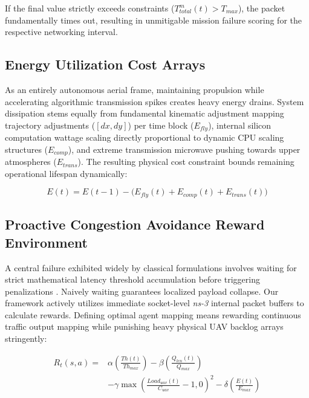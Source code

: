 \documentclass[conference]{IEEEtran}
\begin{document}
If the final value strictly exceeds constraints ($T_{total}^{m}(t) > T_{max}$), the packet fundamentally times out, resulting in unmitigable mission failure scoring for the respective networking interval.

\subsection{Energy Utilization Cost Arrays}
As an entirely autonomous aerial frame, maintaining propulsion while accelerating algorithmic transmission spikes creates heavy energy drains. System dissipation stems equally from fundamental kinematic adjustment mapping trajectory adjustments ($[dx, dy]$) per time block ($E_{fly}$), internal silicon computation wattage scaling directly proportional to dynamic CPU scaling structures ($E_{comp}$), and extreme transmission microwave pushing towards upper atmospheres ($E_{trans}$). The resulting physical cost constraint bounds remaining operational lifespan dynamically:

\begin{equation} \label{eq:energy}
E(t) = E(t-1) - \Big( E_{fly}(t) + E_{comp}(t) + E_{trans}(t) \Big)
\end{equation}

\subsection{Proactive Congestion Avoidance Reward Environment}
A central failure exhibited widely by classical formulations involves waiting for strict mathematical latency threshold accumulation before triggering penalizations \cite{sasinda2025}. Naively waiting guarantees localized payload collapse. Our framework actively utilizes immediate socket-level \textit{ns-3} internal packet buffers to calculate rewards. Defining optimal agent mapping means rewarding continuous traffic output mapping while punishing heavy physical UAV backlog arrays stringently: 

\begin{equation} \label{eq:reward}
\begin{split}
R_t(s,a) = & \alpha \left( \frac{Th(t)}{Th_{max}} \right) - \beta \left( \frac{Q_{len}(t)}{Q_{max}} \right) \\
           & - \gamma \max\left(\frac{Load_{uav}(t)}{C_{uav}} - 1, 0\right)^2 - \delta \left( \frac{E(t)}{E_{max}} \right)
\end{split}
\end{equation}
\end{document}

